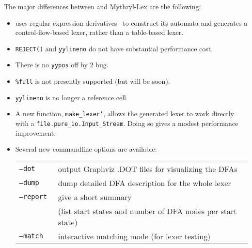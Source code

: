 The major differences between \flex{} and Mythryl-Lex are the following:
\begin{itemize}

\item \flex{} uses regular expression derivatives~\cite{derivatives} to
construct
its automata and generates a control-flow-based lexer, rather than a
table-based lexer.

\item \texttt{REJECT()} and \texttt{yylineno} do not have substantial
performance cost.

\item There is no \texttt{yypos} off by 2 bug.

\item \texttt{\%full} is not presently supported (but will be soon).

\item \texttt{yylineno} is no longer a reference cell.

\item A new function, \texttt{make_lexer'}, allows the generated lexer to work
directly with a \texttt{file.pure_io.Input_Stream}.  Doing so gives a modest
performance improvement.

\item Several new commandline options are available:

\begin{center}
\begin{tabular}{ll}
\tt --dot & output Graphviz .DOT files for visualizing the DFAs \\
\tt --dump & dump detailed DFA description for the whole lexer \\
\tt --report & give a short summary \\
    & (list start states and number of DFA nodes
per start state) \\
\tt --match & interactive matching mode (for lexer testing)
\end{tabular}
\end{center}


\end{itemize}





